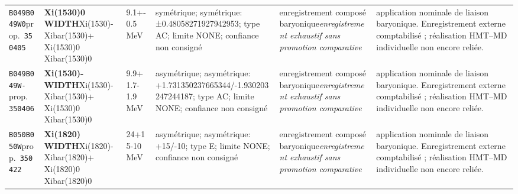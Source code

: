 \begin{landscape}
\begin{longtable}{L{1.85cm}L{4.45cm}L{2.35cm}L{4.05cm}L{3.35cm}L{7.15cm}}
\texttt{B049}\newline \texttt{B049W0}\newline prop.\ \texttt{350405} & \textbf{Xi(1530)0 WIDTH}\newline Xi(1530)- \textbar{}\allowbreak{} Xibar(1530)+ \textbar{}\allowbreak{} Xi(1530)0 \textbar{}\allowbreak{} Xibar(1530)0 & 9.1+-0.5\,MeV & symétrique; symétrique: ±0.48058271927942953; type AC; limite NONE; confiance non consigné & enregistrement composé baryonique\newline \emph{enregistrement exhaustif sans promotion comparative} & application nominale de liaison baryonique. Enregistrement externe comptabilisé ; réalisation HMT--MD individuelle non encore reliée. \\
\texttt{B049}\newline \texttt{B049W-}\newline prop.\ \texttt{350406} & \textbf{Xi(1530)- WIDTH}\newline Xi(1530)- \textbar{}\allowbreak{} Xibar(1530)+ \textbar{}\allowbreak{} Xi(1530)0 \textbar{}\allowbreak{} Xibar(1530)0 & 9.9+1.7-1.9\,MeV & asymétrique; asymétrique: +1.731350237665344/-1.930203247244187; type AC; limite NONE; confiance non consigné & enregistrement composé baryonique\newline \emph{enregistrement exhaustif sans promotion comparative} & application nominale de liaison baryonique. Enregistrement externe comptabilisé ; réalisation HMT--MD individuelle non encore reliée. \\
\texttt{B050}\newline \texttt{B050W}\newline prop.\ \texttt{350422} & \textbf{Xi(1820) WIDTH}\newline Xi(1820)- \textbar{}\allowbreak{} Xibar(1820)+ \textbar{}\allowbreak{} Xi(1820)0 \textbar{}\allowbreak{} Xibar(1820)0 & 24+15-10\,MeV & asymétrique; asymétrique: +15/-10; type E; limite NONE; confiance non consigné & enregistrement composé baryonique\newline \emph{enregistrement exhaustif sans promotion comparative} & application nominale de liaison baryonique. Enregistrement externe comptabilisé ; réalisation HMT--MD individuelle non encore reliée. \\

\end{longtable}
\end{landscape}
